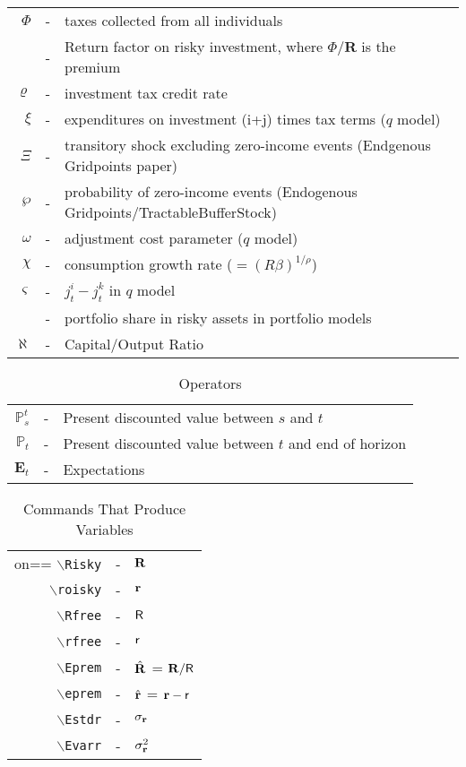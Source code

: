 \documentclass{lecturenotes}
\begin{document}
\begin{table}
\begin{tabular}{rcl}
\\  $\Phi$    & - & taxes collected from all individuals
\\            & - & Return factor on risky investment, where $\Phi/\mathbf{R}$ is the premium
\\  $\varrho$    & - & investment tax credit rate
\\  $\xi$     & - & expenditures on investment (i+j) times tax terms ($q$ model)
\\  $\Xi$     & - & transitory shock excluding zero-income events (Endgenous Gridpoints paper)
\\  $\wp$     & - & probability of zero-income events (Endogenous Gridpoints/TractableBufferStock)
\\  $\omega$  & - & adjustment cost parameter ($q$ model)
\\  $\chi$    & - & consumption growth rate ($=(R \beta)^{1/\rho}$)
\\  $\varsigma$ & - & $j_{t}^{i}-j_{t}^{k}$ in $q$ model
\\   & - & portfolio share in risky assets in portfolio models
\\  $\aleph$  & - & Capital/Output Ratio
\end{tabular}
\end{table}

\begin{table}
\caption{Operators}
\begin{tabular}{rcl}
    $\mathbb{P}_{s}^{t}$ & - & Present discounted value between $s$ and $t$
\\  $\mathbb{P}_{t}$     & - & Present discounted value between $t$ and end of horizon
\\ $\mathbf{E}_{t}$ & - & Expectations
\end{tabular}
\end{table}


\begin{table}
\caption{Commands That Produce Variables}
\begin{tabular}{rcl}on==
   \texttt{$\backslash$Risky} & - & $\mathbf{R}$ 
\\ \texttt{$\backslash$roisky} & - & $\mathbf{r}$
\\ \texttt{$\backslash$Rfree} & - & $\mathsf{R}$
\\ \texttt{$\backslash$rfree} & - & $\mathsf{r}$
\\ \texttt{$\backslash$Eprem} & - & $\hat{\mathbf{R}}$ = $\mathbf{R}/\mathsf{R}$
\\ \texttt{$\backslash$eprem} & - & $\hat{\mathbf{r}}$ = $\mathbf{r} - \mathsf{r}$
\\ \texttt{$\backslash$Estdr} & - & $\sigma_{\mathbf{r}}$
\\ \texttt{$\backslash$Evarr} & - & $\sigma_{\mathbf{r}}^{2}$
\end{tabular}
\end{table}



\end{document}
